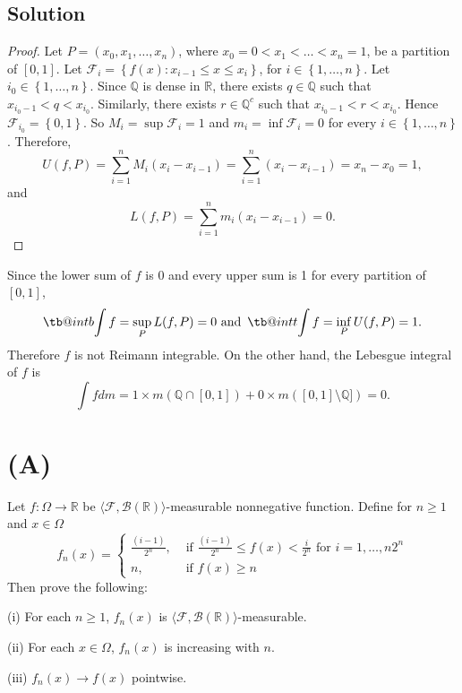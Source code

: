 \documentclass[12pt]{article}
\makeatletter
\newcommand\tint{\mathop{\mathpalette\tb@int{t}}\!\int}
\newcommand\bint{\mathop{\mathpalette\tb@int{b}}\!\int}
\newcommand\tb@int[2]{%
  \sbox\z@{$\m@th#1\int$}%
  \if#2t%
    \rlap{\hbox to\wd\z@{%
      \hfil
      \vrule width .35em height \dimexpr\ht\z@+1.4pt\relax depth -\dimexpr\ht\z@+1pt\relax
      \kern.05em %
    }}
  \else
    \rlap{\hbox to\wd\z@{%
      \vrule width .35em height -\dimexpr\dp\z@+1pt\relax depth \dimexpr\dp\z@+1.4pt\relax
      \hfil
    }}
  \fi
}
\makeatother
\begin{document}
\subsection*{Solution}
\begin{proof}
Let $P = (x_{0}, x_{1}, \hdots, x_{n})$, where $x_{0} = 0 < x_{1} < \dots < x_{n} = 1$, be a partition of $[0,1]$. Let $\mathcal{F}_{i} = \left\{
f(x) : x_{i-1} \leq x \leq  x_{i} \right\}$, for $i \in \left\{ 1, \hdots, n \right\}$. Let $i_{0} \in \left\{ 1, \hdots, n \right\}$.
Since $\mathbb{Q}$ is dense in $\mathbb{R}$, there exists $q \in \mathbb{Q}$ such that $x_{i_{0}-1} < q < x_{i_{0}}$. Similarly, there exists $r \in \mathbb{Q}^{c}$ such that
$x_{i_{0}-1} < r < x_{i_0}$. Hence $\mathcal{F}_{i_0} = \left\{ 0,1 \right\}$. So $M_{i} = \sup \mathcal{F}_{i} = 1$ and $m_{i} = \inf \mathcal{F}_{i} = 0$ for
every $i \in \left\{ 1, \hdots, n \right\}$. Therefore,
\[ U(f,P) = \sum_{i=1}^{n}M_{i}(x_{i} - x_{i-1}) = \sum_{i=1}^{n}(x_{i} - x_{i-1}) = x_{n} - x_{0} = 1, \] 
and 
\[ L(f,P) = \sum_{i=1}^{n}m_{i}(x_{i}-x_{i-1}) = 0. \]
\end{proof}
Since the lower sum of $f$ is 0 and every upper sum is 1 for every partition of $[0,1]$,
\[ \bint f = \sup_{P} L(f,P) = 0 \text{ and } \tint f = \inf_{P} U(f,P) = 1. \]
Therefore $f$ is not Reimann integrable. On the other hand, the Lebesgue integral of $f$ is 
\[ \int f dm = 1 \times m(\mathbb{Q} \cap [0,1]) + 0\times m([0,1] \setminus \mathbb{Q}]) = 0. \]


\newpage 
\section*{(A)}
Let $f:\Omega \rightarrow \mathbb{R}$ be $\langle\mathcal{F}, \mathcal{B}(\mathbb{R})\rangle$-measurable nonnegative function. Define for $n \geq 1$
and $x \in \Omega$ 
\[ f_{n}(x) = \left\{ \begin{array}{cl} \frac{(i-1)}{2^{n}}, & \text{ if } \frac{(i-1)}{2^{n}} \leq f(x) < \frac{i}{2^{n}} \text{ for }i = 1, \hdots ,
n2^{n} \\
n, & \text{ if } f(x) \geq n
\end{array} \right. \]
Then prove the following:

(i) For each $n\geq 1$, $f_{n}(x)$ is $\langle\mathcal{F}, \mathcal{B}(\mathbb{R})\rangle$-measurable. 

(ii) For each $x \in \Omega$, $f_{n}(x)$ is increasing with $n$.

(iii) $f_{n}(x) \rightarrow f(x)$ pointwise.
\end{document}
